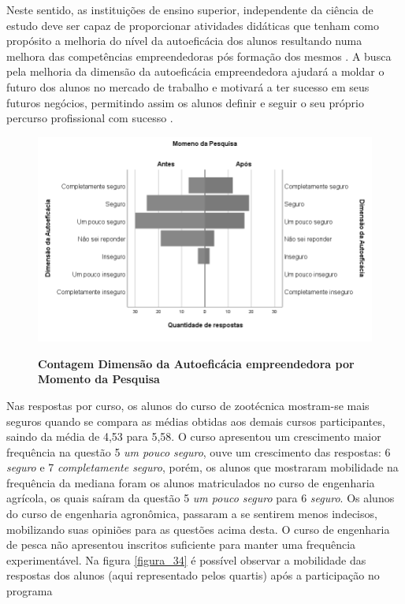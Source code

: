 Neste sentido, as instituições de ensino superior, independente da ciência de estudo deve ser capaz de proporcionar atividades didáticas que tenham como propósito a melhoria do nível da autoeficácia dos alunos resultando numa melhora das competências empreendedoras  pós formação dos mesmos \cite{ribeiro_autoeficacia_2019}. A busca pela melhoria da dimensão da autoeficácia empreendedora ajudará a moldar o futuro dos alunos no mercado de trabalho e motivará a ter sucesso em seus futuros negócios, permitindo assim os alunos  definir e seguir o seu próprio percurso profissional com sucesso  \cite{das_examining_2018}.

\begin{figure}[H]
\centering
\caption{\textbf{
Contagem Dimensão da Autoeficácia empreendedora  por Momento da Pesquisa}}
\includegraphics[scale=0.6]{Imagens/histograma_autoeficacia_antes.png}
\label{figura_29}
\end{figure}


Nas respostas por curso, os alunos do curso de zootécnica mostram-se mais seguros quando se compara as médias obtidas aos demais cursos participantes, saindo da média de 4,53 para 5,58. O curso apresentou um crescimento maior frequência na questão 5 \textit{um pouco seguro}, ouve um crescimento das respostas: 6 \textit{seguro} e 7 \textit{completamente seguro}, porém, os alunos que mostraram mobilidade na frequência da mediana foram os alunos matriculados no curso de engenharia agrícola, os quais saíram da questão 5 \textit{um pouco seguro} para 6 \textit{seguro}. Os alunos do curso de engenharia agronômica, passaram a se sentirem menos indecisos, mobilizando suas opiniões para as questões acima desta. O curso de engenharia de pesca não apresentou inscritos suficiente para manter uma frequência experimentável. Na figura \ref{figura_34} é possível observar a mobilidade das respostas dos alunos (aqui representado pelos quartis) após a participação no programa


